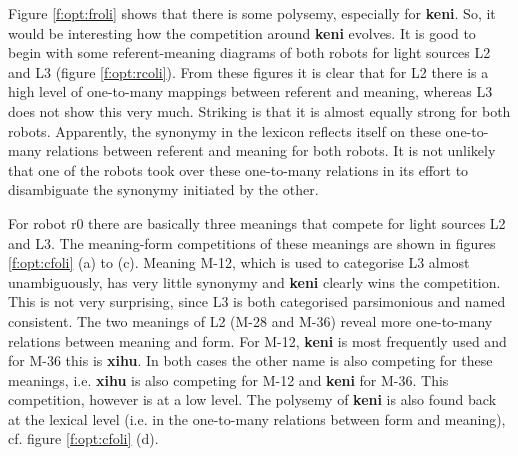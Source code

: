 Figure \ref{f:opt:froli} shows that there is some polysemy, especially for {\bf keni}. So, it would be interesting how the competition around {\bf keni} evolves. It is good to begin with some referent-meaning diagrams of both robots for light sources L2 and L3 (figure \ref{f:opt:rcoli}). From these figures it is clear that for L2 there is a high level of one-to-many mappings between referent and meaning, whereas L3 does not show this very much. Striking is that it is almost equally strong for both robots. Apparently, the synonymy in the lexicon reflects itself on these one-to-many relations between referent and meaning for both robots. It is not unlikely that one of the robots took over these one-to-many relations in its effort to disambiguate the synonymy initiated by the other. 

For robot r0 there are basically three meanings that compete for light sources L2 and L3. The meaning-form competitions of these meanings are shown in figures \ref{f:opt:cfoli} (a) to (c). Meaning M-12, which is used to categorise L3 almost unambiguously, has very little synonymy and {\bf keni} clearly wins the competition. This is not very surprising, since L3 is both categorised  parsimonious and named consistent. The two meanings of L2 (M-28 and M-36) reveal more one-to-many relations between meaning and form. For M-12, {\bf keni} is most frequently used and for M-36 this is {\bf xihu}. In both cases the other name is also competing for these meanings, i.e. {\bf xihu} is also competing for M-12 and {\bf keni} for M-36. This competition, however is at a low level. The polysemy of {\bf keni} is also found back at the lexical level (i.e. in the one-to-many relations between form and meaning), cf. figure \ref{f:opt:cfoli} (d). 

